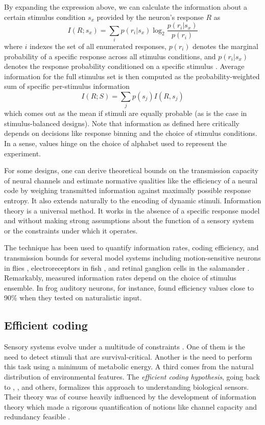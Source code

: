 By expanding the expression above, we can calculate the information about a certain stimulus condition $s_x$ provided by the neuron's response $R$ as
\begin{equation}
    I(R; s_x) = \sum_{i} p(r_i | s_x) \log_2 \frac{p(r_i | s_x)}{p(r_i)}
\end{equation}
where $i$ indexes the set of all enumerated responses, $p(r_i)$ denotes the marginal probability of a specific response across all stimulus conditions, and $p(r_i | s_x)$ denotes the response probability conditioned on a specific stimulus \citep{Borst:1999hw}. Average information for the full stimulus set is then computed as the probability-weighted sum of specific per-stimulus information
\begin{equation}
    I(R; S) = \sum_{j} p(s_j) I(R, s_j)
\end{equation}
which comes out as the mean if stimuli are equally probable (as is the case in stimulus-balanced designs). Note that information as defined here critically depends on decisions like response binning and the choice of stimulus conditions. In a sense, values hinge on the choice of alphabet used to represent the experiment.

For some designs, one can derive theoretical bounds on the transmission capacity of neural channels and estimate normative qualities like the efficiency of a neural code by weighing transmitted information against maximally possible response entropy. It also extends naturally to the encoding of dynamic stimuli. Information theory is a universal method. It works in the absence of a specific response model and without making strong assumptions about the function of a sensory system or the constraints under which it operates.

The technique has been used to quantify information rates, coding efficiency, and transmission bounds for several model systems including motion-sensitive neurons in flies \citep{Bialek:1991aa,vanSteveninck:1997aa,Haag:1998wr,Weber:2012dr}, electroreceptors in fish \citep{Wessel:1996aa}, and retinal ganglion cells in the salamander \citep{Warland:1997aa}. Remarkably, measured information rates depend on the choice of stimulus ensemble. In frog auditory neurons, for instance, \citet{Rieke:1995aa} found efficiency values close to 90\% when they tested on naturalistic input.

\subsection{Efficient coding}
Sensory systems evolve under a multitude of constraints \citep{Sterling:2015aa}. One of them is the need to detect stimuli that are survival-critical. Another is the need to perform this task using a minimum of metabolic energy. A third comes from the natural distribution of environmental features. The \textit{efficient coding hypothesis}, going back to \citet{Attneave:1954aa}, \citet{Barlow:1961aa}, and others, formalizes this approach to understanding biological sensors. Their theory was of course heavily influenced by the development of information theory which made a rigorous quantification of notions like channel capacity and redundancy feasible \citep{Cover:2006aa,Borst:1999hw}.

